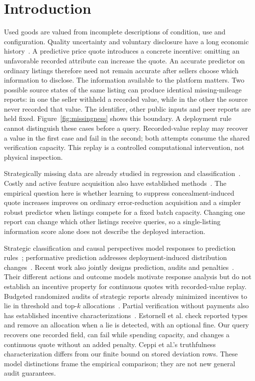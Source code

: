 \section{Introduction}
Used goods are valued from incomplete descriptions of condition, use and
configuration. Quality uncertainty and voluntary disclosure have a long
economic history~\cite{akerlof1970lemons,grossman1981disclosure,milgrom1981news}.
A predictive price quote introduces a concrete incentive: omitting an
unfavorable recorded attribute can increase the quote. An accurate predictor
on ordinary listings therefore need not remain accurate after sellers choose
which information to disclose. The information available to the platform
matters. Two possible source states of the same listing can produce
identical missing-mileage reports: in one the seller withheld a recorded
value, while in the other the source never recorded that value.
The identifier, other public inputs and peer reports are held fixed.
Figure~\ref{fig:missingness}
shows this boundary. A deployment rule cannot distinguish these cases before
a query. Recorded-value replay may recover a value in the first case and fail
in the second; both attempts consume the shared verification capacity.
This replay is a controlled computational intervention, not physical inspection.

Strategically missing data are already studied in regression and
classification~\cite{zhang2020strategic,krishnaswamy2021withheld}. Costly and
active feature acquisition also have established methods~\cite{janisch2019costly,
shim2018joint,li2021gsm,covert2023information,valancius2024aco}.
The empirical question here is whether learning to suppress concealment-induced
quote increases improves on ordinary error-reduction acquisition and a simpler
robust predictor when listings compete for a fixed batch capacity. Changing one
report can change which other listings receive queries, so a single-listing
information score alone does not describe the deployed interaction.

Strategic classification and causal perspectives model responses to prediction
rules~\cite{hardt2016strategic,dong2018preferences,miller2020causal}; performative
prediction addresses deployment-induced distribution changes~\cite{perdomo2020performative}.
Recent work also jointly designs prediction, audits and
penalties~\cite{ebrahimi2026audit}. Their different actions and outcome models
motivate response analysis but do not establish an incentive property for
continuous quotes with recorded-value replay.
Budgeted randomized audits of strategic reports already minimized incentives
to lie in threshold and top-$k$ allocations~\cite{estornell2021audits}.
Partial verification without payments also has established incentive
characterizations~\cite{ceppi2019verification}.
Estornell et al. check reported types and remove an allocation when a lie
is detected, with an optional fine. Our query recovers one recorded field,
can fail while spending capacity, and changes a continuous quote without
an added penalty. Ceppi et al.'s truthfulness characterization differs from
our finite bound on stored deviation rows. These model distinctions frame
the empirical comparison; they are not new general audit guarantees.

